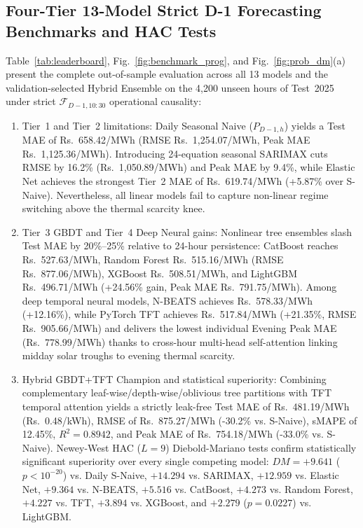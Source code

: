 \documentclass[runningheads,a4paper]{llncs}
\begin{document}
\subsection{Four-Tier 13-Model Strict D-1 Forecasting Benchmarks and HAC Tests}
Table~\ref{tab:leaderboard}, Fig.~\ref{fig:benchmark_prog}, and Fig.~\ref{fig:prob_dm}(a) present the complete out-of-sample evaluation across all 13 models and the validation-selected Hybrid Ensemble on the 4,200 unseen hours of Test~2025 under strict $\mathcal{F}_{D-1, 10:30}$ operational causality:
\begin{enumerate}
    \item Tier~1 and Tier~2 limitations: Daily Seasonal Naive ($P_{D-1,h}$) yields a Test MAE of Rs.~658.42/MWh (RMSE Rs.~1,254.07/MWh, Peak MAE Rs.~1,125.36/MWh). Introducing 24-equation seasonal SARIMAX cuts RMSE by 16.2\% (Rs.~1,050.89/MWh) and Peak MAE by 9.4\%, while Elastic Net achieves the strongest Tier~2 MAE of Rs.~619.74/MWh (+5.87\% over S-Naive). Nevertheless, all linear models fail to capture non-linear regime switching above the thermal scarcity knee.
    \item Tier~3 GBDT and Tier~4 Deep Neural gains: Nonlinear tree ensembles slash Test MAE by 20\%--25\% relative to 24-hour persistence: CatBoost reaches Rs.~527.63/MWh, Random Forest Rs.~515.16/MWh (RMSE Rs.~877.06/MWh), XGBoost Rs.~508.51/MWh, and LightGBM Rs.~496.71/MWh (+24.56\% gain, Peak MAE Rs.~791.75/MWh). Among deep temporal neural models, N-BEATS achieves Rs.~578.33/MWh (+12.16\%), while PyTorch TFT achieves Rs.~517.84/MWh (+21.35\%, RMSE Rs.~905.66/MWh) and delivers the lowest individual Evening Peak MAE (Rs.~778.99/MWh) thanks to cross-hour multi-head self-attention linking midday solar troughs to evening thermal scarcity.
    \item Hybrid GBDT+TFT Champion and statistical superiority: Combining complementary leaf-wise/depth-wise/oblivious tree partitions with TFT temporal attention yields a strictly leak-free Test MAE of Rs.~481.19/MWh (Rs.~0.48/kWh), RMSE of Rs.~875.27/MWh (-30.2\% vs. S-Naive), sMAPE of 12.45\%, $R^2 = 0.8942$, and Peak MAE of Rs.~754.18/MWh (-33.0\% vs. S-Naive). Newey-West HAC ($L=9$) Diebold-Mariano tests confirm statistically significant superiority over every single competing model: $DM = +9.641$ ($p < 10^{-20}$) vs. Daily S-Naive, $+14.294$ vs. SARIMAX, $+12.959$ vs. Elastic Net, $+9.364$ vs. N-BEATS, $+5.516$ vs. CatBoost, $+4.273$ vs. Random Forest, $+4.227$ vs. TFT, $+3.894$ vs. XGBoost, and $+2.279$ ($p = 0.0227$) vs. LightGBM.
\end{enumerate}
\end{document}
